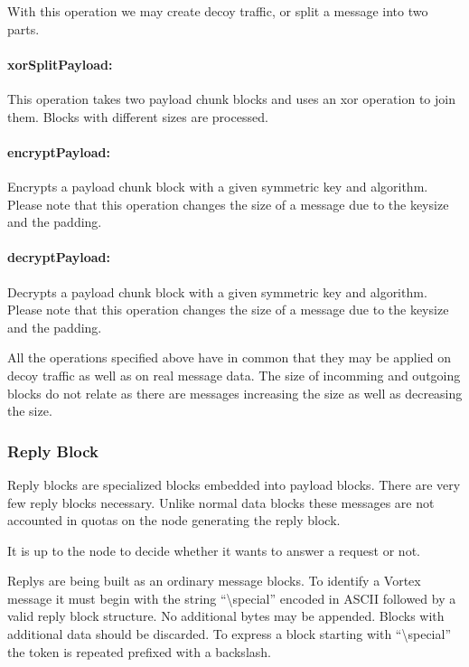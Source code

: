 With this operation we may create decoy traffic, or split a message into two parts.

\paragraph{xorSplitPayload:} This operation takes two payload chunk blocks and uses an xor operation to join them. Blocks with different sizes are processed.

\paragraph{encryptPayload:} Encrypts a payload chunk block with a given symmetric key and algorithm. Please note that this operation changes the size of a message due to the keysize and the padding.

\paragraph{decryptPayload:} Decrypts a payload chunk block with a given symmetric key and algorithm. Please note that this operation changes the size of a message due to the keysize and the padding.

All the operations specified above have in common that they may be applied on decoy traffic as well as on real message data. The size of incomming and outgoing blocks do not relate as there are messages increasing the size as well as decreasing the size.

\subsubsection{Reply Block\label{sec:replyBlock}}
Reply blocks are specialized blocks embedded into payload blocks. There are very few reply blocks necessary. Unlike normal data blocks these messages are not accounted in quotas on the node generating the reply block. 

It is up to the node to decide whether it wants to answer a request or not.

Replys are being built as an ordinary message blocks. To identify a Vortex message it must begin with the string ``\textbackslash special'' encoded in ASCII followed by a valid reply block structure. No additional bytes may be appended. Blocks with additional data should be discarded. To express a block starting with ``\textbackslash special'' the token is repeated prefixed with a backslash.

